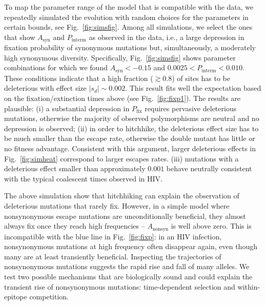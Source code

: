 \documentclass[rmp, twocolumn]{revtex4}
\newcommand{\pfix}{P_{\mathrm{fix}}}
\newcommand{\FIG}[1]{Fig.~\ref{fig:#1}}
\begin{document}
To map the parameter range of the model that is compatible with the data, we
repeatedly simulated the evolution with random choices for the parameters in
certain bounds, see \FIG{simsfig}. Among all simulations, we select the ones
that show $A_\text{syn}$ and $P_\text{interm}$ as observed in the data, i.e., a
large depression in fixation probability of synonymous mutations but,
simultaneously, a moderately high synonymous diversity. Specifically,
\FIG{simsfig} shows parameter combinations for which we found $A_\text{syn} <
-0.15$ and $0.0025 < P_\text{interm} < 0.010$. These conditions indicate that a
high fraction ($\gtrsim 0.8$) of sites has to be deleterious with effect size
$|s_d| \sim 0.002$.  This result fits well the expectation based on the
fixation/extinction times above (see \FIG{fixp1}). The results are plausible:
(i) a substantial depression in $\pfix$ requires pervasive deleterious
mutations, otherwise the majority of observed polymorphisms are neutral and no
depression is observed; (ii) in order to hitchhike, the deleterious effect size
has to be much smaller than the escape rate, otherwise the double mutant has
little or no fitness advantage. Consistent with this argument, larger
deleterious effects in \FIG{simheat} correspond to larger escapes rates. (iii)
mutations with a deleterious effect smaller than approximately $0.001$ behave
neutrally consistent with the typical coalescent times observed in HIV.

The above simulation show that hitchhiking can explain the observation of
deleterious mutations that rarely fix. However, in a simple model where
nonsynonymous escape mutations are unconditionally beneficial, they almost
always fix once they reach high frequencies -- $A_{\mathrm{nonsyn}}$ is well
above zero. This is incompatible with the blue line in \FIG{fixp}: in an HIV
infection, nonsynonymous mutations at high frequency often disappear again, even
though many are at least transiently beneficial. Inspecting the trajectories of
nonsynonymous mutations suggests the rapid rise and fall of many alleles. We
test two possible mechanisms that are biologically sound and could explain
the transient rise of nonsynonymous mutations: time-dependent selection and
within-epitope competition.
\end{document}
